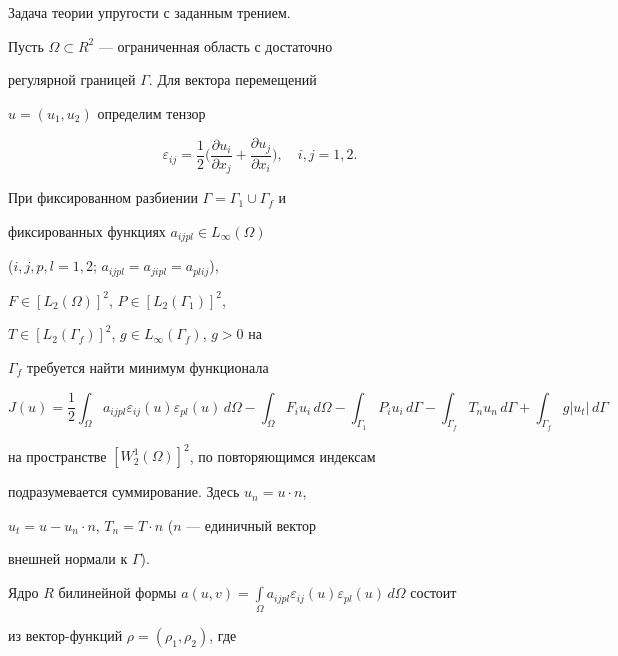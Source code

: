 \begin{examnonum}


Задача теории упругости с заданным трением.





Пусть $\Omega\subset R^2$ --- ограниченная область с достаточно


регулярной границей $\Gamma$. Для вектора перемещений


$u=(u_1,u_2)$ определим тензор


$$


\varepsilon_{ij}=\frac12\bigg(\frac{\partial u_i}{\partial x_j}+


\frac{\partial u_j}{\partial x_i}\bigg),\quad i,j=1,2.


$$


При фиксированном разбиении $\Gamma=\Gamma_1\cup\Gamma_f$ и


фиксированных функциях $a_{ijpl}\in L_\infty(\Omega)$


($i,j,p,l=1,2$; $a_{ijpl}=a_{jipl}=a_{plij}$),


$F\in[L_2(\Omega)]^2$, $P\in[L_2(\Gamma_1)]^2$,


$T\in[L_2(\Gamma_f)]^2$, $g\in L_\infty(\Gamma_f)$, $g>0$ на


$\Gamma_f$ требуется найти минимум функционала


$$


J(u)=\frac12\int_\Omega a_{ijpl}\varepsilon_{ij}(u)


\varepsilon_{pl}(u)\,d\Omega-\int_\Omega


F_iu_i\,d\Omega-\int_{\Gamma_1}P_iu_i\,d\Gamma-


\int_{\Gamma_f}T_nu_n\,d\Gamma+\int_{\Gamma_f}g|u_t|\,d\Gamma


$$


на пространстве $[W_2^1(\Omega)]^2$, по повторяющимся индексам


подразумевается суммирование. Здесь $u_n=u\cdot n$,


$u_t=u-u_n\cdot n$, $T_n=T\cdot n$ ($n$ --- единичный вектор


внешней нормали к $\Gamma$).





Ядро $R$ билинейной формы $a(u,v)=\int\limits_\Omega


a_{ijpl}\varepsilon_{ij}(u)\varepsilon_{pl}(u)\,d\Omega$ состоит


из вектор-функций $\rho=(\rho_1,\rho_2)$, где



\end{examnonum}
